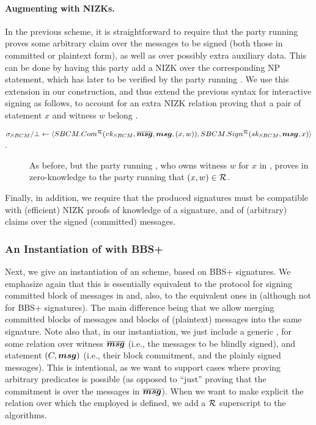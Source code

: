 \paragraph{Augmenting with NIZKs.} %
In the previous \SBCM scheme, it is straightforward to require that the party
running \SBCMCom proves some arbitrary claim over the messages to be signed
(both those in committed or plaintext form), as well as over possibly extra
auxiliary data. This can be done by having this party add a NIZK over the
corresponding NP statement, which has later to be verified by the party running
\SBCMSign.
%
We use this extension in our \CUASGen construction, and thus extend the previous
syntax for interactive signing  as follows, to account for an extra NIZK
relation \NIZKRel proving that a pair of statement $x$ and witness $w$ belong
\NIZKRel.

\begin{description}
\item[$\sigma_{SBCM}/\bot \gets \langle SBCM.Com^{\mathcal{R}}(vk_{SBCM},\overline{\boldsymbol{msg}},
  \boldsymbol{msg},(x,w)),SBCM.Sign^{\mathcal{R}}(sk_{SBCM},\boldsymbol{msg},x) \rangle$.] As before, but
  the party running \SBCMCom, who owns witness $w$ for $x$ in \NIZKRel, proves
  in zero-knowledge to the party running \SBCMSign that $(x,w) \in \mathcal{R}$.
\end{description}

Finally, in addition, we require that the produced signatures must be compatible
with (efficient) NIZK proofs of knowledge of a signature, and of (arbitrary)
claims over the signed (committed) messages.

\subsubsection{An Instantiation of \SBCM with BBS+}

Next, we give an instantiation of an \SBCM scheme, based on BBS+ signatures.
We emphasize again that this is essentially equivalent to the protocol for
signing committed block of messages in \cite{asm06} and, also, to the equivalent
ones in \cite{cl02,ps16} (although not for BBS+ signatures). The main difference
being that we allow merging committed blocks of messages and blocks of
(plaintext) messages into the same signature.
%
Note also that, in our instantiation, we just include a generic \NIZK, for some
relation over witness $\overline{\boldsymbol{msg}}$ (i.e., the messages to be blindly
signed), and statement $(C,\boldsymbol{msg})$ (i.e., their block commitment, and the
plainly signed messages). This is intentional, as we want to support cases where
proving arbitrary predicates is possible (as opposed to ``just'' proving that
the commitment is over the messages in $\overline{\boldsymbol{msg}}$).
%
When we want to make explicit the relation over which the employed \NIZK is
defined, we add a $\mathcal{R}$ superscript to the algorithms.

